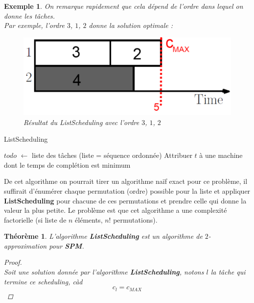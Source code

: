 \documentclass{article}
\newcommand{\titre}[1]{\textcolor{title}{#1}}
\newtheorem{exemple}{Exemple}[section]
\newtheorem{thm}{Th\'eor\`eme}[section]
\newtheorem{proof}{Preuve}[section]
\begin{document}
\begin{sffamily}
\begin{exemple}
On remarque rapidement que cela dépend de l'ordre dans lequel on donne les tâches.  \\ Par exemple, l'ordre $3$, $1$, $2$ donne la solution 
optimale :

\begin{figure}[h!]
    \begin{center}
    \includegraphics[scale=0.3]{spm6.pdf}
    \caption{Résultat du ListScheduling avec l'ordre $3$, $1$, $2$}
    \end{center}	
\end{figure}

\end{exemple}

\begin{algorithm}[h!]
\caption{ListScheduling}
\begin{algorithmic}[1]
\STATE $todo$ $\leftarrow$ liste des tâches (liste = séquence ordonnée)
\STATE Attribuer $t$ à une machine dont le temps de complétion est minimum
\ENDFOR
\end{algorithmic}
\end{algorithm}

De cet algorithme on pourrait tirer un algorithme naïf exact pour ce problème, il suffirait d'énumérer chaque permutation (ordre) possible 
pour la liste et appliquer \textbf{ListScheduling} pour chacune de ces permutations et prendre celle qui donne la valeur la plus petite. Le 
problème est que cet algorithme a une complexité factorielle (si liste de $n$ éléments, $n!$ permutations).

\newpage

\begin{thm} L'algorithme \textbf{ListScheduling} est un algorithme de $2$-approximation pour \textbf{\titre{SPM}}.
\begin{proof}$ $\\
Soit une solution donnée par l'algorithme \textbf{ListScheduling}, notons $l$ la tâche qui termine ce scheduling, càd $$c_l = c_{MAX}$$


\end{proof}
\end{thm}
\end{sffamily}
\end{document}

